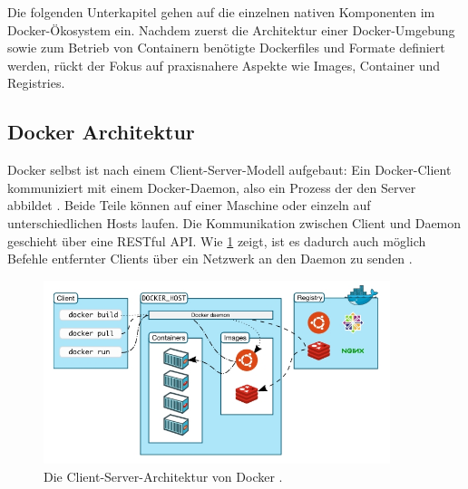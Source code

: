 \documentclass[../main.tex]{subfiles}
\begin{document}

		Die folgenden Unterkapitel gehen auf die einzelnen nativen Komponenten im Docker-Ökosystem ein. Nachdem zuerst die Architektur einer Docker-Umgebung sowie zum Betrieb von Containern benötigte Dockerfiles und Formate definiert werden, rückt der Fokus auf praxisnahere Aspekte wie Images, Container und Registries.



		\subsection{Docker Architektur}
		\label{dockerArchitecture}
      Docker selbst ist nach einem Client-Server-Modell aufgebaut: Ein Docker-Client kommuniziert mit einem Docker-Daemon, also ein Prozess der den Server abbildet \cite{dockerUnderstandingDocker}. Beide Teile können auf einer Maschine oder einzeln auf unterschiedlichen Hosts laufen. Die Kommunikation zwischen Client und Daemon geschieht über eine \acrshort{REST}ful \acrshort{API}. Wie \fig \ref{fig:intro_dockerArchitecture} zeigt, ist es dadurch auch möglich Befehle entfernter Clients über ein Netzwerk an den Daemon zu senden \cite[S.3]{dockerSecIntro}.

      \begin{figure}[h]
          \centering
          \includegraphics[width=0.9\textwidth]{./images/intro_dockerArchitecture.jpg}
          \caption{Die Client-Server-Architektur von Docker \cite{dockerUnderstandingDocker}.}
          \label{fig:intro_dockerArchitecture}
      \end{figure}
\end{document}
